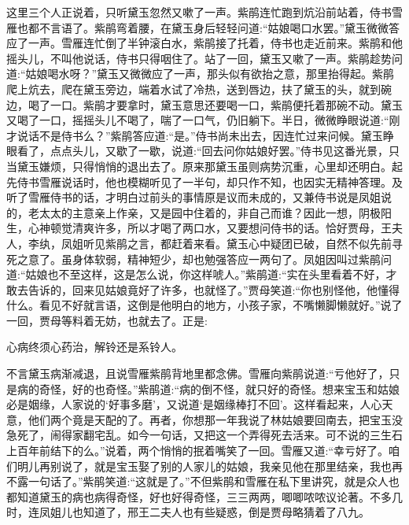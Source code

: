 \begin{parag}
    这里三个人正说着，只听黛玉忽然又嗽了一声。紫鹃连忙跑到炕沿前站着，侍书雪雁也都不言语了。紫鹃弯着腰，在黛玉身后轻轻问道:“姑娘喝口水罢。”黛玉微微答应了一声。雪雁连忙倒了半钟滚白水，紫鹃接了托着，侍书也走近前来。紫鹃和他摇头儿，不叫他说话，侍书只得咽住了。站了一回，黛玉又嗽了一声。紫鹃趁势问道:“姑娘喝水呀？”黛玉又微微应了一声，那头似有欲抬之意，那里抬得起。紫鹃爬上炕去，爬在黛玉旁边，端着水试了冷热，送到唇边，扶了黛玉的头，就到碗边，喝了一口。紫鹃才要拿时，黛玉意思还要喝一口，紫鹃便托着那碗不动。黛玉又喝了一口，摇摇头儿不喝了，喘了一口气，仍旧躺下。半日，微微睁眼说道:“刚才说话不是侍书么？”紫鹃答应道:“是。”侍书尚未出去，因连忙过来问候。黛玉睁眼看了，点点头儿，又歇了一歇，说道:“回去问你姑娘好罢。”侍书见这番光景，只当黛玉嫌烦，只得悄悄的退出去了。原来那黛玉虽则病势沉重，心里却还明白。起先侍书雪雁说话时，他也模糊听见了一半句，却只作不知，也因实无精神答理。及听了雪雁侍书的话，才明白过前头的事情原是议而未成的，又兼侍书说是凤姐说的，老太太的主意亲上作亲，又是园中住着的，非自己而谁？因此一想，阴极阳生，心神顿觉清爽许多，所以才喝了两口水，又要想问侍书的话。恰好贾母，王夫人，李纨，凤姐听见紫鹃之言，都赶着来看。黛玉心中疑团已破，自然不似先前寻死之意了。虽身体软弱，精神短少，却也勉强答应一两句了。凤姐因叫过紫鹃问道:“姑娘也不至这样，这是怎么说，你这样唬人。”紫鹃道:“实在头里看着不好，才敢去告诉的，回来见姑娘竟好了许多，也就怪了。”贾母笑道:“你也别怪他，他懂得什么。看见不好就言语，这倒是他明白的地方，小孩子家，不嘴懒脚懒就好。”说了一回，贾母等料着无妨，也就去了。正是:
\end{parag}


\begin{poem}
    \begin{pl}
        心病终须心药治，解铃还是系铃人。
    \end{pl}
\end{poem}


\begin{parag}
    不言黛玉病渐减退，且说雪雁紫鹃背地里都念佛。雪雁向紫鹃说道:“亏他好了，只是病的奇怪，好的也奇怪。”紫鹃道:“病的倒不怪，就只好的奇怪。想来宝玉和姑娘必是姻缘，人家说的‘好事多磨’，又说道‘是姻缘棒打不回’。这样看起来，人心天意，他们两个竟是天配的了。再者，你想那一年我说了林姑娘要回南去，把宝玉没急死了，闹得家翻宅乱。如今一句话，又把这一个弄得死去活来。可不说的三生石上百年前结下的么。”说着，两个悄悄的抿着嘴笑了一回。雪雁又道:“幸亏好了。咱们明儿再别说了，就是宝玉娶了别的人家儿的姑娘，我亲见他在那里结亲，我也再不露一句话了。”紫鹃笑道:“这就是了。”不但紫鹃和雪雁在私下里讲究，就是众人也都知道黛玉的病也病得奇怪，好也好得奇怪，三三两两，唧唧哝哝议论著。不多几时，连凤姐儿也知道了，邢王二夫人也有些疑惑，倒是贾母略猜着了八九。
\end{parag}


